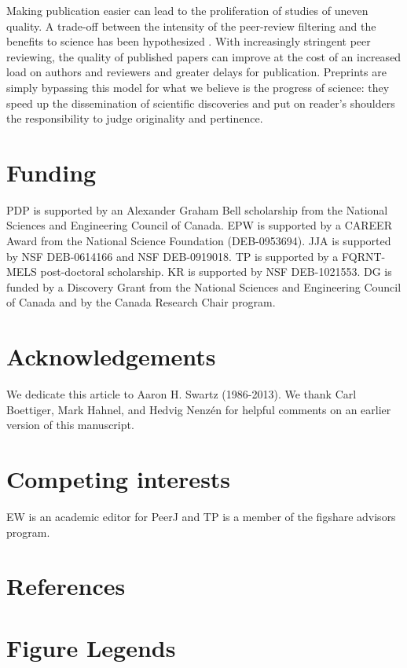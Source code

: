 \documentclass[10pt]{article}
\begin{document}
Making publication easier can lead to the proliferation of studies of uneven 
quality. A trade-off between the intensity of the peer-review filtering and 
the benefits to science has been hypothesized \cite{Aarssen2012}.  With 
increasingly stringent peer reviewing, the quality of published papers can 
improve at the cost of an increased load on authors and 
reviewers and greater delays for publication.  Preprints are simply 
bypassing this model for what we believe is the progress of science: they 
speed up the dissemination of scientific discoveries and put on reader's 
shoulders the responsibility to judge originality and pertinence.

\section*{Funding}

PDP is supported by an Alexander Graham Bell scholarship from the National
Sciences and Engineering Council of Canada. EPW is supported by a CAREER Award
from the National Science Foundation (DEB-0953694). JJA is supported by NSF
DEB-0614166 and NSF DEB-0919018.  TP is supported by a FQRNT-MELS post-doctoral
scholarship. KR is supported by NSF DEB-1021553. DG is funded by a Discovery
Grant from the National Sciences and Engineering Council of Canada and by the
Canada Research Chair program.

\section*{Acknowledgements}

We dedicate this article to Aaron H. Swartz (1986-2013).  We thank Carl
Boettiger, Mark Hahnel, and Hedvig Nenz\'en for helpful comments on an earlier
version of this manuscript.

\section*{Competing interests}

EW is an academic editor for PeerJ and TP is a member of the figshare advisors
program.

\section*{References}


\newpage
\section*{Figure Legends}
\end{document}
